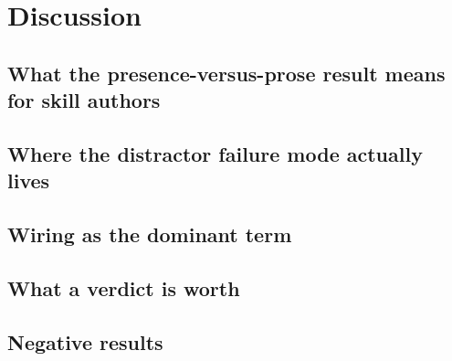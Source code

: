 \section{Discussion}
\label{sec:discussion}


\subsection{What the presence-versus-prose result means for skill authors}

\subsection{Where the distractor failure mode actually lives}

\subsection{Wiring as the dominant term}

\subsection{What a verdict is worth}

\subsection{Negative results}
%
